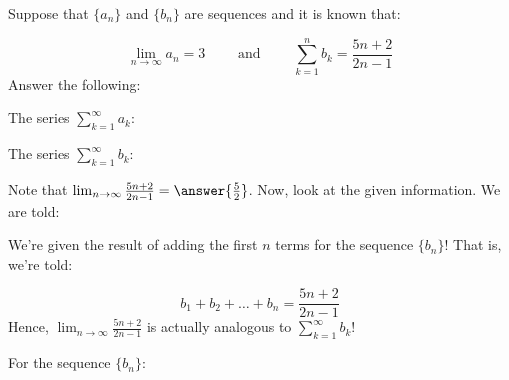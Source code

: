 \documentclass{ximera}
\author{Jim Talamo}
\begin{document}
\begin{exercise}

Suppose that $\{a_n\}$ and $\{b_n\}$ are sequences and it is known that:

\[
\lim_{n \to \infty} a_n = 3 \qquad \textrm{ and } \qquad \sum_{k=1}^{n} b_k = \frac{5n+2}{2n-1}
\]
Answer the following:

The series $\sum_{k=1}^{\infty} a_k$:
\begin{multipleChoice}
\end{multipleChoice}

\begin{exercise}
The series $\sum_{k=1}^{\infty} b_k$:
\begin{multipleChoice}
\end{multipleChoice}

\begin{hint}
Note that $\lim_{n \to \infty} \frac{5n+2}{2n-1} = \answer{\frac{5}{2}}$.  Now, look at the given information.  We are told:

\begin{multipleChoice}
\end{multipleChoice}

We're given the result of adding the first $n$ terms for the sequence $\{b_n\}$!  That is, we're told:

\[
b_1+b_2 + \ldots + b_n =  \frac{5n+2}{2n-1}
\]
Hence, $\lim_{n \to \infty} \frac{5n+2}{2n-1}$ is actually analogous to $\sum_{k=1}^{\infty} b_k$!
\end{hint}

\begin{exercise}
For the sequence $\{b_n\}$:
\begin{multipleChoice}
\end{multipleChoice}


\end{exercise}
\end{exercise}
\end{exercise}
\end{document}

